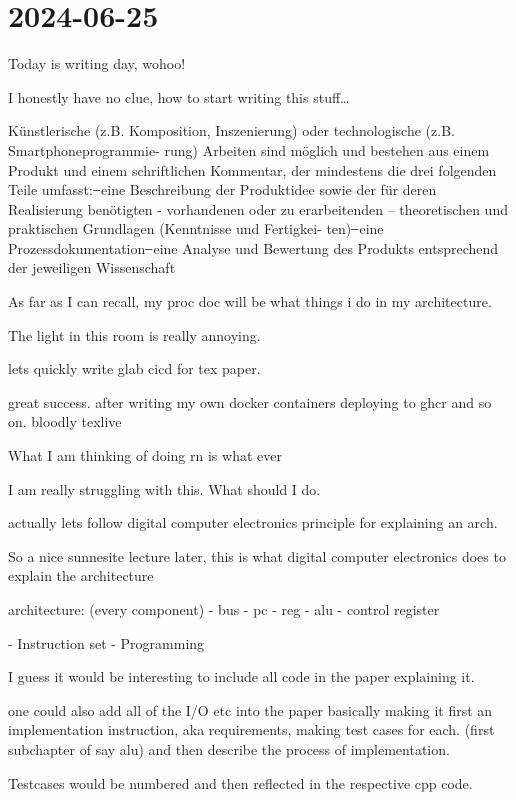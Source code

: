 \section{2024-06-25} %
\label{sec:2024-06-25}
Today is writing day, wohoo!

I honestly have no clue, how to start writing this stuff\dots

Künstlerische (z.B. Komposition, Inszenierung) oder technologische (z.B. Smartphoneprogrammie-
rung) Arbeiten sind möglich und bestehen aus einem Produkt und einem schriftlichen Kommentar,
der mindestens die drei folgenden Teile umfasst:
̶ eine Beschreibung der Produktidee sowie der für deren Realisierung benötigten - vorhandenen
oder zu erarbeitenden – theoretischen und praktischen Grundlagen (Kenntnisse und Fertigkei-
ten)
̶ eine Prozessdokumentation
̶ eine Analyse und Bewertung des Produkts entsprechend der jeweiligen Wissenschaft

As far as I can recall, my proc doc will be what things i do in my architecture. 

The light in this room is really annoying.

lets quickly write glab cicd for tex paper.

great success. after writing my own docker containers deploying to ghcr and so on. bloodly texlive



What I am thinking of doing rn is what ever

I am really struggling with this. What should I do. 

actually lets follow digital computer electronics principle for explaining an arch. 


So a nice sunnesite lecture later, this is what digital computer electronics does to explain the architecture

architecture:
(every component)
- bus
- pc
- reg
- alu
- control register 

- Instruction set
- Programming

I guess it would be interesting to include all code in the paper explaining it. 

one could also add all of the I/O etc into the paper
basically making it first an implementation instruction, aka requirements, making test cases for each. (first subchapter of say alu) and then describe the process of implementation. 

Testcases would be numbered and then reflected in the respective cpp code. 

